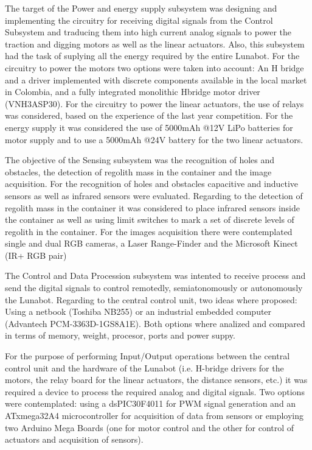 \documentclass[conference]{IEEEtran}
\begin{document}
The target of the Power and energy supply subsystem was designing and implementing the circuitry for receiving digital signals from the Control Subsystem and traducing them into high current analog signals to power the traction and digging motors as well as the linear actuators. Also, this subsystem had the task of suplying all the energy required by the entire Lunabot. For the circuitry to power the motors two options were taken into account: An H bridge and a driver implemented with discrete components available in the local market in Colombia, and a fully integrated monolithic Hbridge motor driver (VNH3ASP30). For the circuitry to power the linear actuators, the use of relays  was considered, based on the experience of  the last year competition. For the energy supply it was considered the use of 5000mAh @12V LiPo batteries for motor supply and to use a 5000mAh @24V battery for the two linear actuators.

The objective of the Sensing subsystem was the recognition of holes and obstacles, the detection of regolith mass in the container and the image acquisition.  For the recognition of holes and obstacles capacitive and inductive sensors as well as infrared sensors were evaluated. Regarding to the detection of regolith mass in the container  it was considered to place infrared sensors inside the container as well as using limit switches to mark a set of discrete levels of regolith in the container. For the images acquisition there were contemplated single and dual RGB cameras, a Laser Range-Finder and the Microsoft Kinect (IR+ RGB pair)

The Control and Data Procession subsystem was intented to receive process and send the digital signals to control remotedly, semiatonomously or autonomously the Lunabot. Regarding to the central control unit, two ideas where proposed: Using a netbook (Toshiba NB255) or an industrial embedded computer (Advantech PCM-3363D-1GS8A1E).  Both options where analized and compared in terms of memory, weight, procesor, ports and power suppy. 

For the purpose of performing Input/Output operations between the central control unit and the hardware of the Lunabot (i.e. H-bridge drivers for the motors, the relay board for the linear actuators, the distance sensors, etc.) it was required a device to process the required analog and digital signals. Two options were contemplated:  using a dsPIC30F4011 for PWM signal generation and an ATxmega32A4 microcontroller for acquisition of data from sensors or employing two Arduino Mega Boards (one for motor control and the other for control of actuators and acquisition of sensors).
\end{document}
